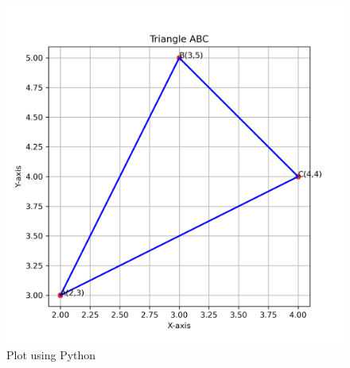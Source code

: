 \documentclass[journal,12pt,onecolumn]{IEEEtran}
\begin{document}
\begin{figure}[H]
	\centering
	\includegraphics[scale=0.5]{triangle}
	\caption*{Plot using Python}
	\label{img}
\end{figure}
\end{document}
